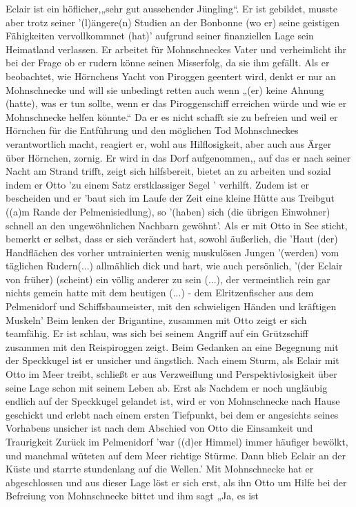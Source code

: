 {Eclair ist ein höflicher,\cite[S.16]{pir}\cite[S.42ff]{pir}„sehr gut aussehender Jüngling“.\cite[S.15]{pir} Er ist gebildet, \cite[S.15]{pir} musste aber trotz seiner '(l)ängere(n) Studien an der Bonbonne (wo er) seine geistigen Fähigkeiten vervollkommnet (hat)'\cite[S.15]{pir} aufgrund seiner finanziellen Lage sein Heimatland verlassen.\cite[S.15f]{pir} Er arbeitet für Mohnschneckes Vater und verheimlicht ihr bei der Frage ob er rudern könne \cite[S.17]{pir} seinen Misserfolg, da sie ihm gefällt.\cite[S.17]{pir} Als er beobachtet, wie Hörnchens Yacht von Piroggen geentert wird, denkt er nur an Mohnschnecke und will sie unbedingt retten\cite[S.29]{pir} auch wenn „(er) keine Ahnung (hatte), was er tun sollte, wenn er das Piroggenschiff erreichen würde und wie er Mohnschnecke helfen könnte.“ Da er es nicht schafft sie zu befreien und weil er Hörnchen für die Entführung und den möglichen Tod Mohnschneckes verantwortlich macht, reagiert er, wohl aus Hilflosigkeit, aber auch aus Ärger über Hörnchen, zornig.\cite[S.36]{pir} Er wird in das Dorf aufgenommen,\cite[S.67]{pir}, auf das er nach seiner Nacht am Strand trifft, \cite[S.43]{pir} zeigt sich hilfsbereit,\cite[S.44]{pir} bietet an zu arbeiten\cite[S.44]{pir} und sozial indem er Otto 'zu einem Satz erstklassiger Segel '\cite[S.106ff]{pir} verhilft. Zudem ist er bescheiden und er 'baut sich im Laufe der Zeit eine kleine Hütte aus Treibgut ((a)m Rande der Pelmenisiedlung),\cite[S.67]{pir} so '(haben) sich (die übrigen Einwohner) schnell an den ungewöhnlichen Nachbarn gewöhnt'.\cite[S.67]{pir} Als er mit Otto in See sticht, bemerkt er selbst, dass er sich verändert hat, sowohl äußerlich, die 'Haut (der) Handflächen\cite[S.66]{pir} des vorher untrainierten wenig muskulösen Jungen \cite[S.15]{pir} '(werden) vom täglichen Rudern(...) allmählich dick und hart,\cite[S.66]{pir} wie auch persönlich, '(der Eclair von früher) (scheint) ein völlig anderer zu sein (...), der vermeintlich rein gar nichts gemein hatte mit dem heutigen (...) - dem Elritzenfischer aus dem Pelmenidorf und Schiffsbaumeister, mit den schwieligen Händen und kräftigen Muskeln'\cite[S.137]{pir} Beim lenken der Brigantine, zusammen mit Otto zeigt er sich teamfähig. \cite[S.134]{pir} Er ist schlau, was sich bei seinem Angriff auf ein Grützschiff zusammen mit den Reispiroggen zeigt. \cite[S.309ff]{pir} Beim Gedanken an eine Begegnung mit der Speckkugel ist er  unsicher und ängstlich.\cite[S.162]{pir} Nach einem Sturm, als Eclair mit Otto im Meer treibt, schließt er aus Verzweiflung und Perspektivlosigkeit über seine Lage schon mit seinem Leben ab. \cite[S.209]{pir} Erst als Nachdem er noch ungläubig endlich auf der Speckkugel gelandet ist,\cite[S.460]{pir} wird er von Mohnschnecke nach Hause geschickt \cite[S.464]{pir} und erlebt  nach einem ersten Tiefpunkt, bei dem er angesichts seines Vorhabens unsicher ist \cite[S.414]{pir} nach dem Abschied von Otto die Einsamkeit und Traurigkeit \cite[S.515f]{pir} Zurück im Pelmenidorf 'war ((d)er Himmel) immer häufiger bewölkt, und manchmal wüteten auf dem Meer richtige Stürme. Dann blieb Eclair an der Küste und starrte stundenlang auf die Wellen.'\cite[S.515f]{pir} Mit Mohnschnecke hat er abgeschlossen und aus dieser Lage löst er sich erst, als ihn Otto um Hilfe bei der Befreiung von Mohnschnecke bittet und ihm sagt „Ja, es ist }
